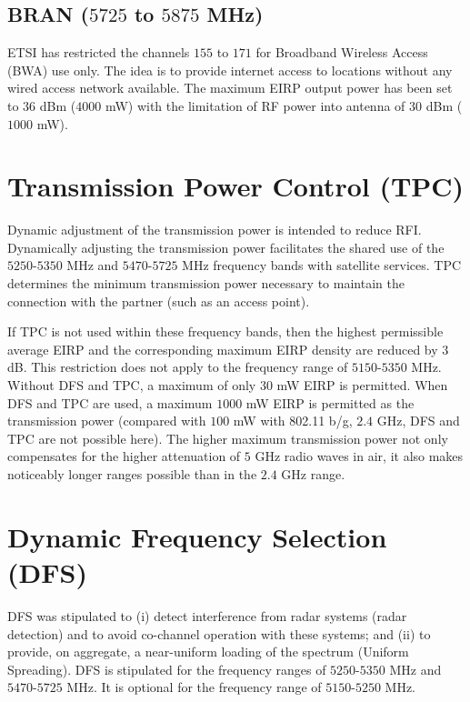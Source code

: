 \subsection{BRAN ($5725$ to $5875$ MHz)} 

ETSI has restricted the channels $155$ to $171$ for Broadband Wireless Access (BWA) use only. The idea is to provide internet access to locations without any wired access network available. The maximum EIRP output power has been set to $36$ dBm ($4000$ mW) with the limitation of RF power into antenna of $30$ dBm ($1000$ mW).


\section{Transmission Power Control (TPC)}

Dynamic adjustment of the transmission power is intended to reduce RFI. Dynamically adjusting the transmission power facilitates the shared use of the $5250$-$5350$ MHz and $5470$-$5725$ MHz frequency bands with satellite services. TPC determines the minimum transmission power necessary to maintain the connection with the partner (such as an access point).

If TPC is not used within these frequency bands, then the highest permissible average EIRP and the corresponding maximum EIRP density are reduced by $3$ dB. This restriction does not apply to the frequency range of $5150$-$5350$ MHz. Without DFS and TPC, a maximum of only $30$ mW EIRP is permitted. When DFS and TPC are used, a maximum $1000$ mW EIRP is permitted as the transmission power (compared with $100$ mW with 802.11 b/g, $2.4$ GHz, DFS and TPC are not possible here). The higher maximum transmission power not only compensates for the higher attenuation of $5$ GHz radio waves in air, it also makes noticeably longer ranges possible than in the $2.4$ GHz range. 


\section{Dynamic Frequency Selection (DFS)}

DFS was stipulated to (i) detect interference from radar systems (radar detection) and to avoid co-channel operation with these systems; and (ii) to provide, on aggregate, a near-uniform loading of the spectrum (Uniform Spreading). DFS is stipulated for the frequency ranges of $5250$-$5350$ MHz and $5470$-$5725$ MHz. It is optional for the frequency range of $5150$-$5250$ MHz.

